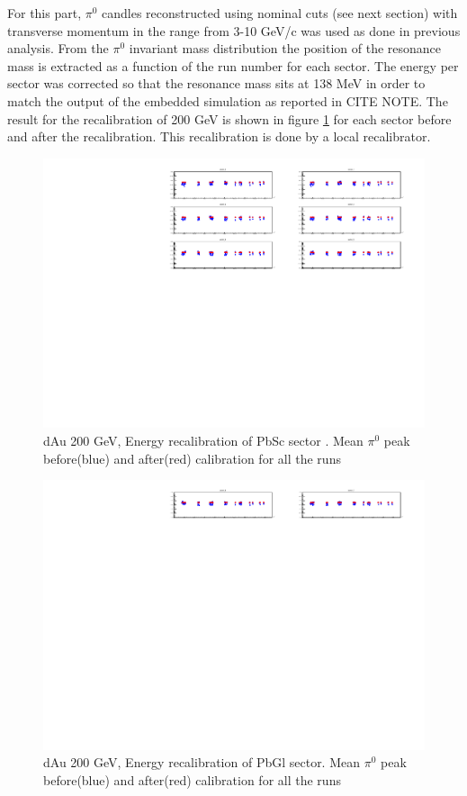 \documentclass{article}
\begin{document}
For this part, $\pi^{0}$ candles reconstructed using nominal cuts (see next section) with transverse momentum in the range from 3-10 GeV/c was used as done in previous analysis.
From the $\pi^{0}$ invariant mass distribution the position of the resonance mass is extracted as a function of the run number for each sector.
The energy per sector was corrected so that the resonance mass sits at 138 MeV in order to match the output of the embedded simulation as reported in CITE NOTE.
The result for the recalibration of 200 GeV is shown in figure \ref{recalib200GeV} for each sector before and after the recalibration.
This recalibration is done by a local recalibrator.
\begin{figure}
    \centering
    \includegraphics[width=1\textwidth]{fig_pi0vn/mean_pi0vsrun_sect0-5}
    \caption{dAu 200 GeV, Energy recalibration of PbSc sector . Mean $\pi^{0}$ peak before(blue) and after(red) calibration for all the runs}
    \label{recalib200GeV}
\end{figure}
\begin{figure}
    \centering
    \includegraphics[width=1\textwidth]{fig_pi0vn/mean_pi0vsrun_sect6-7}
    \caption{dAu 200 GeV, Energy recalibration of PbGl sector. Mean $\pi^{0}$ peak before(blue) and after(red) calibration for all the runs}
    \label{meanpi0vsrunsect67}
\end{figure}
\end{document}
